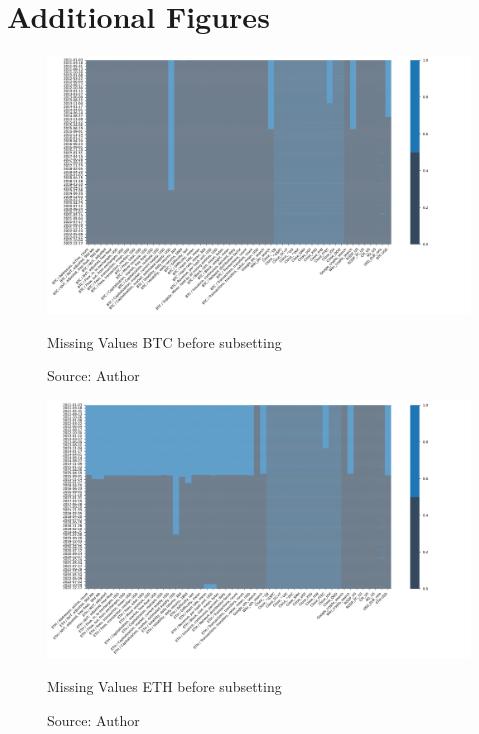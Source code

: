 \chapter{Additional Figures}

\begin{figure}[!htbp]
    \centering
    \includegraphics[width=1.1\linewidth,height=0.9\textheight,keepaspectratio]{Figures/BTC_missing_1.png}
    \caption{Missing Values BTC before subsetting}
    \label{fig:btc_missing_1}
    \caption*{Source: Author}
\end{figure}

\begin{figure}[!htbp]
    \centering
    \includegraphics[width=1.1\linewidth,height=0.9\textheight,keepaspectratio]{Figures/ETH_missing_1.png}
    \caption{Missing Values ETH before subsetting}
    \label{fig:eth_missing_1}
    \caption*{Source: Author}
\end{figure}

